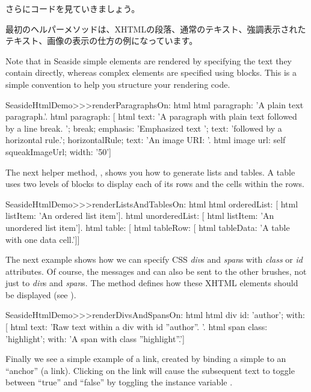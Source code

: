 \documentclass[a4paper,10pt,twoside]{book}
\begin{document}
{{さらにコードを見ていきましょう。

最初のヘルパーメソッドは、XHTMLの段落、通常のテキスト、強調表示されたテキスト、画像の表示の仕方の例になっています。



Note that in Seaside simple elements are rendered by specifying the text they contain directly, whereas complex elements are specified using blocks.
This is a simple convention to help you structure your rendering code.

\begin{code}{}
SeasideHtmlDemo>>>renderParagraphsOn: html 
	html paragraph: 'A plain text paragraph.'.
	html paragraph: [
		html
			text: 'A paragraph with plain text followed by a line break. ';
			break;
			emphasis: 'Emphasized text ';
			text: 'followed by a horizontal rule.';
			horizontalRule;
			text: 'An image URI: '.
		html image
			url: self squeakImageUrl;
			width: '50']
\end{code}

The next helper method, , shows you how to generate lists and tables.
A table uses two levels of blocks to display each of its rows and the cells within the rows.

\begin{code}{}
SeasideHtmlDemo>>>renderListsAndTablesOn: html 
	html orderedList: [
		html listItem: 'An ordered list item'].
	html unorderedList: [
		html listItem: 'An unordered list item'].
	html table: [
		html tableRow: [
			html tableData: 'A table with one data cell.']]
\end{code}

The next example shows how we can specify CSS \emph{div}s and \emph{span}s with \emph{class} or \emph{id} attributes.
Of course, the messages  and  can also be sent to the other brushes, not just to \emph{div}s and \emph{span}s.
The method  defines how these XHTML elements should be displayed (see ).

\begin{code}{}
SeasideHtmlDemo>>>renderDivsAndSpansOn: html 
	html div
		id: 'author';
		with: [
			html text: 'Raw text within a div with id ''author''. '.
			html span
				class: 'highlight';
				with: 'A span with class ''highlight''.']
\end{code}

Finally we see a simple example of a link, created by binding a simple  to an ``anchor'' (\ie a link).
Clicking on the link will cause the subsequent text to toggle between ``true'' and ``false'' by toggling the instance variable .

}}
\end{document}
